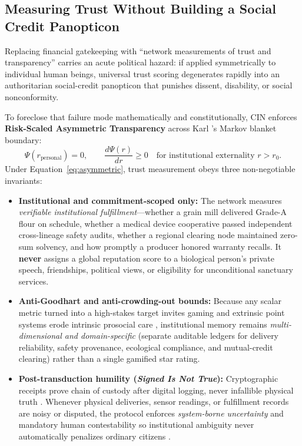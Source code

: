 \documentclass[11pt]{article}
\begin{document}
\subsection{Measuring Trust Without Building a Social Credit Panopticon}

Replacing financial gatekeeping with ``network measurements of trust and transparency'' carries an acute political hazard: if applied symmetrically to individual human beings, universal trust scoring degenerates rapidly into an authoritarian social-credit panopticon that punishes dissent, disability, or social nonconformity.

To foreclose that failure mode mathematically and constitutionally, CIN enforces \textbf{Risk-Scaled Asymmetric Transparency} across Karl \citet{friston2013life}'s Markov blanket boundary:
\begin{equation}
  \Psi(r_{\mathrm{personal}}) = 0, \qquad \frac{d\Psi(r)}{dr} \ge 0 \quad \text{for institutional externality } r > r_0.
  \label{eq:asymmetric}
\end{equation}
Under Equation~\eqref{eq:asymmetric}, trust measurement obeys three non-negotiable invariants:
\begin{itemize}
  \item \textbf{Institutional and commitment-scoped only:} The network measures \emph{verifiable institutional fulfillment}---whether a grain mill delivered Grade-A flour on schedule, whether a medical device cooperative passed independent cross-lineage safety audits, whether a regional clearing node maintained zero-sum solvency, and how promptly a producer honored warranty recalls. It \textbf{never} assigns a global reputation score to a biological person's private speech, friendships, political views, or eligibility for unconditional sanctuary services.
  \item \textbf{Anti-Goodhart and anti-crowding-out bounds:} Because any scalar metric turned into a high-stakes target invites gaming \citep{strathern1997ratings} and extrinsic point systems erode intrinsic prosocial care \citep{deci1999rewards}, institutional memory remains \emph{multi-dimensional and domain-specific} (separate auditable ledgers for delivery reliability, safety provenance, ecological compliance, and mutual-credit clearing) rather than a single gamified star rating.
  \item \textbf{Post-transduction humility (\emph{Signed Is Not True}):} Cryptographic receipts prove chain of custody after digital logging, never infallible physical truth \citep{fu2018sensors}. Whenever physical deliveries, sensor readings, or fulfillment records are noisy or disputed, the protocol enforces \emph{system-borne uncertainty} and mandatory human contestability so institutional ambiguity never automatically penalizes ordinary citizens \citep{baker2026cin}.
\end{itemize}
\end{document}

